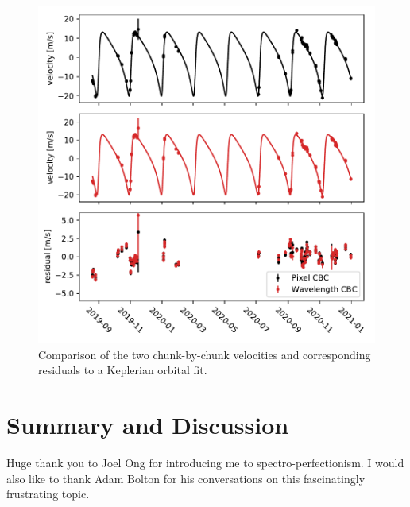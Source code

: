 \begin{figure}
    \centering
    \includegraphics{figures-5/cbc-comparison.pdf}
    \caption{Comparison of the two chunk-by-chunk velocities and corresponding residuals to a Keplerian orbital fit.}
    \label{fig:cbc-comparison}
\end{figure}


\section{Summary and Discussion} \label{pipeline2:discussion}




Huge thank you to Joel Ong for introducing me to spectro-perfectionism. I would also like to thank Adam Bolton for his conversations on this fascinatingly frustrating topic.

